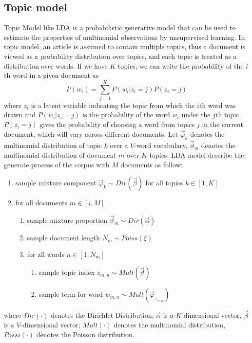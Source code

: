 \documentclass[runningheads,a4paper]{llncs}
\begin{document}
\subsection{Topic model}
\label{topic model}
Topic Model like LDA \cite{Blei:2003}  is a probabilistic generative model that can be used to estimate the properties of multinomial observations by unsupervised learning. In topic model, an article is assumed to contain multiple topics, thus a document is viewed as a probability distribution over topics, and each topic is treated as a distribution over words. If we have $K$ topics, we can write the probability of the $i$th word in a given document as
\begin{equation}
P(w_i)=\sum_{j=1}^{K}P(w_i|z_i=j)P(z_i=j)
\end{equation}
where $z_i$ is a latent variable indicating the topic from which the $i$th word was drawn and $P(w_i|z_i=j)$ is the probability of the word $w_i$ under the $j$th topic. $P(z_i=j)$ gives the probability of choosing a word from topics $j$ in the current document, which will vary across different documents.  Let $\vec{\varphi}_k$ denotes the multinomial distribution of topic $k$ over a $V$-word vocabulary, $\vec{\vartheta}_m$ denotes the multinomial distribution of document $m$ over $K$ topics. LDA model describe the generate process of the corpus with $M$ documents as follow:
\begin{enumerate}
  \item sample mixture component $\vec{\varphi}_k \sim Dir(\vec{\beta})$ for all topics $k \in [1, K]$
  \item for all documents $m \in [i, M]$ 
  \begin{enumerate}
    \item sample mixture proportion $\vec{\vartheta}_m \sim Dir(\vec{\alpha})$
    \item sample document length $N_m \sim Poiss(\xi)$
    \item for all words $n \in [1, N_m]$
    \begin{enumerate}
      \item sample topic index $z_{m,n} \sim Mult(\vec{\vartheta})$
      \item sample term for word $w_{m,n} \sim Mult(\vec{\varphi}_{z_{m,n}})$
    \end{enumerate}
  \end{enumerate}
\end{enumerate}
where $Dir(\cdot)$ denotes the Dirichlet Distribution, $\vec{\alpha}$ is a $K$-dimensional vector, $\vec{\beta}$ is a $V$-dimensional vector; $Mult(\cdot)$ denotes the multinomial distribution, $Possi(\cdot)$ denotes the Poisson distribution. 
\end{document}
